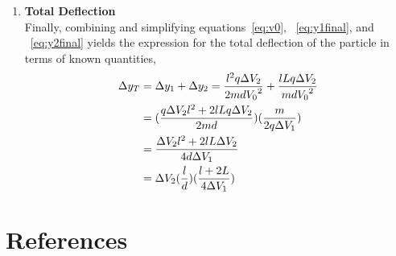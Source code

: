 \documentclass[twocolumn,english,amsmath,amssymb]{IEEEtran}
\theoremstyle{plain}
\theoremstyle{plain}
\begin{document}
\begin{enumerate}
  \item {\textbf{Total Deflection}}\\
  Finally, combining and simplifying equations~\ref{eq:v0}, ~\ref{eq:y1final}, and ~\ref{eq:y2final} yields the expression for the total deflection of the particle in terms of known quantities,
  \begin {align}\label{eq:final}
   \Delta y_T & = \Delta y_1 + \Delta y_2 = \frac{l^2 q\Delta V_2}{2md{V_0}^2} + \frac{l L q\Delta V_2}{md{V_0}^2} \notag \\
   & = (\frac{q \Delta V_2 l^2 + 2lLq\Delta V_2}{2md})(\frac{m}{2q\Delta V_1}) \notag \\
   & = \frac{\Delta V_2 l^2 + 2lL\Delta V_2}{4d\Delta V_1}\notag \\
   & = \Delta V_2 (\frac{l}{d})(\frac{l+2L}{4\Delta V_1})
  \end {align}

\end{enumerate}



\section*{References}
\cite{serway2010physics}
\end{document}
